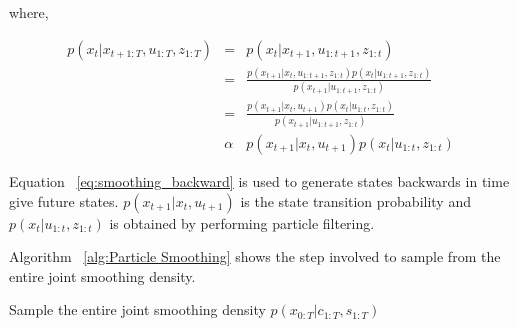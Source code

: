 \documentclass[12pt]{dalcsthesis}
\begin{document}
where,

\begin{eqnarray}
p(x_{t}|x_{t+1:T},u_{1:T},z_{1:T}) & = & p(x_{t}|x_{t+1},u_{1:t+1},z_{1:t})\\
 & = & \frac{p(x_{t+1}|x_{t},u_{1:t+1},z_{1:t})p(x_{t}|u_{1:t+1},z_{1:t})}{p(x_{t+1}|u_{1:t+1},z_{1:t})}\\
 & = & \frac{p(x_{t+1}|x_{t},u_{t+1})p(x_{t}|u_{1:t},z_{1:t})}{p(x_{t+1}|u_{1:t+1},z_{1:t})}\\
\label{eq:smoothing_backward} & \alpha & p(x_{t+1}|x_{t},u_{t+1})p(x_{t}|u_{1:t},z_{1:t})
\end{eqnarray}

Equation ~\ref{eq:smoothing_backward} is used to generate states backwards in time give future states. $p(x_{t+1}|x_{t},u_{t+1})$ is the state transition probability and $p(x_{t}|u_{1:t},z_{1:t})$ is obtained by performing particle filtering. 

Algorithm ~\ref{alg:Particle Smoothing} shows the step involved to sample from the entire joint smoothing density.

\begin{algorithm}[H]
 \SetAlgoLined
  	\label{alg:Particle Smoothing}
	\caption{Sample the entire joint smoothing density $p(x_{0:T}|c_{1:T},s_{1:T})$}
	
\end{algorithm}
\end{document}
